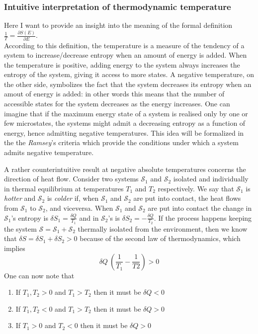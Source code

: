 \subsubsection*{Intuitive interpretation of thermodynamic temperature}
Here I want to provide an insight into the meaning of the formal definition $\frac{1}{T} = \frac{\partial S(E)}{\partial E}$. \\
According to this definition, the temperature is a measure of the tendency of a system to increase/decrease entropy when an amount of energy is added. When the temperature is positive, adding energy to the system always 
increases the entropy of the system, giving it access to more states. A negative temperature, on the other side, symbolizes the fact that the system decreases its entropy when an amout of energy is added: in other 
words this means that the number of accessible states for the system decreases as the energy increases. One can imagine that if the maximum energy state of a system is realised only by one or few microstates, the systems might admit a decreasing 
entropy as a function of energy, hence admitting negative temperatures. This idea will be formalized in the the \emph{Ramsey}'s criteria which provide the conditions under which a system admits negative temperature. \par
\vspace{15pt}
A rather counterintuitive result at negative absolute temperatures concerns the direction of heat flow. Consider two systems $\mathcal{S}_1$ and $\mathcal{S}_2$ isolated and individually in thermal equilibrium at temperatures $T_1$ and $T_2$ respectively. We say that $\mathcal{S}_1$ is \textit{hotter} and $\mathcal{S}_2$ is \textit{colder} if, when 
$\mathcal{S}_1$ and $\mathcal{S}_2$ are put into contact, the heat flows from $\mathcal{S}_1$ to $\mathcal{S}_2$, and viceversa. When $\mathcal{S}_1$ and $\mathcal{S}_2$ are put into contact the change in $\mathcal{S}_1$'s entropy is $\delta S_1 = \frac{\delta Q}{T_1}$ and in $\mathcal{S}_2$'s is $\delta S_2 = -\frac{\delta Q}{T_2}$. If the process happens keeping 
the system $\mathcal{S} = \mathcal{S}_1 + \mathcal{S}_2$ thermally isolated from the environment, then we know that $\delta S = \delta S_1 + \delta S_2 > 0$ because of the second law of thermodynamics, which implies 
\begin{equation*}
    \delta Q \ \left(\frac{1}{T_1} - \frac{1}{T2}\right) > 0
\end{equation*}
One can now note that
\begin{enumerate}
    \item If $T_1, T_2 > 0$ and $T_1 > T_2$ then it must be $\delta Q < 0$
    \item If $T_1, T_2 < 0$ and $T_1 > T_2$ then it must be $\delta Q > 0$
    \item If $T_1 > 0$ and $T_2 < 0$ then it must be $\delta Q > 0$
\end{enumerate}
